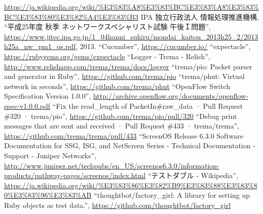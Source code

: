 \begin{thebibliography}{99}
         \url{https://ja.wikipedia.org/wiki/\%E3\%83\%A8\%E3\%83\%BC\%E3\%83\%A8\%E3\%83\%BC\%E3\%83\%80\%E3\%82\%A4\%E3\%83\%B3}
         IPA 独立行政法人 情報処理推進機構,
         ``平成25年度 秋季 ネットワークスペシャリスト試験 午後Ｉ問題'',
         \url{https://www.jitec.ipa.go.jp/1_04hanni_sukiru/mondai_kaitou_2013h25_2/2013h25a_nw_pm1_qs.pdf}, 2013.
         ``Cucumber'',
         \url{https://cucumber.io/}
         ``expectacle'',
         \url{https://rubygems.org/gems/expectacle}
         ``Logger - Trema - Relish'',
         \url{http://www.relishapp.com/trema/trema/docs/logger}
         ``trema/pio: Packet parser and generator in Ruby'',
         \url{https://github.com/trema/pio}
         ``trema/phut: Virtual network in seconds'',
         \url{https://github.com/trema/phut}
         ``OpenFlow Switch Specification Version 1.0.0'',
         \url{http://archive.openflow.org/documents/openflow-spec-v1.0.0.pdf}
  ``Fix the read\_length of PacketIn\#raw\_data ·
         Pull Request \#320 · trema/pio'',
         \url{https://github.com/trema/pio/pull/320}
  ``Debug print messages that are sent and received
         · Pull Request \#433 · trema/trema'',
         \url{https://github.com/trema/trema/pull/433}
  ``ScreenOS Release 6.3.0 Software
         Documentation for SSG, ISG, and NetScreen Series - Technical
         Documentation - Support - Juniper Networks'',
         \url{http://www.juniper.net/techpubs/en_US/screenos6.3.0/information-products/pathway-pages/screenos/index.html}
  ``テストダブル - Wikipedia'',
         \url{https://ja.wikipedia.org/wiki/%E3%83%86%E3%82%B9%E3%83%88%E3%83%80%E3%83%96%E3%83%AB}
  ``thoughtbot/factory\_girl: A library for setting
         up Ruby objects as test data.'',
         \url{https://github.com/thoughtbot/factory_girl}
\end{thebibliography}

